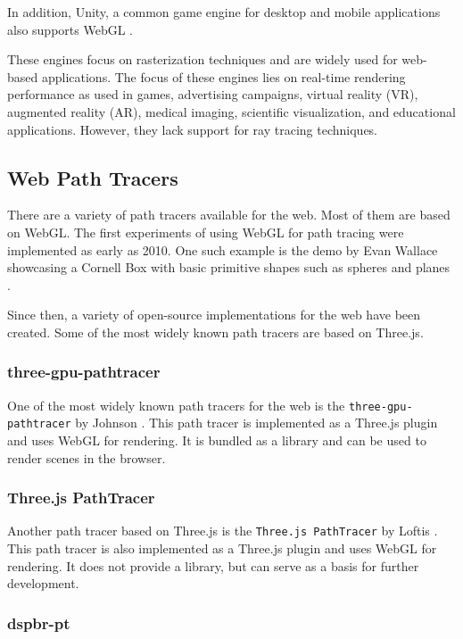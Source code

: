 In addition, \gls{Unity}, a common game engine for desktop and mobile applications also supports WebGL \cite{unityWebGLCompatibility}.

These engines focus on rasterization techniques and are widely used for web-based applications. The focus of these engines lies on real-time rendering performance as used in games, advertising campaigns, virtual reality (VR), augmented reality (AR), medical imaging, scientific visualization, and educational applications. However, they lack support for ray tracing techniques. 

\subsection*{Web Path Tracers}

There are a variety of path tracers available for the web. Most of them are based on WebGL. The first experiments of using WebGL for path tracing were implemented as early as 2010. One such example is the demo by Evan Wallace showcasing a Cornell Box with basic primitive shapes such as spheres and planes \cite{pathTracerWallace}.

Since then, a variety of open-source implementations for the web have been created. Some of the most widely known path tracers are based on \gls{Three.js}.

\subsubsection{three-gpu-pathtracer}

One of the most widely known path tracers for the web is the \texttt{three-gpu-pathtracer} by Johnson \cite{ThreeJsPathTracerJohnson}. This path tracer is implemented as a \gls{Three.js} plugin and uses WebGL for rendering.  It is bundled as a library and can be used to render scenes in the browser.

\subsubsection{Three.js PathTracer}

Another path tracer based on \gls{Three.js} is the \texttt{Three.js PathTracer} by Loftis \cite{ThreeJsPathTracerLoftis}. This path tracer is also implemented as a \gls{Three.js} plugin and uses WebGL for rendering. It does not provide a library, but can serve as a basis for further development.

\subsubsection{dspbr-pt}

